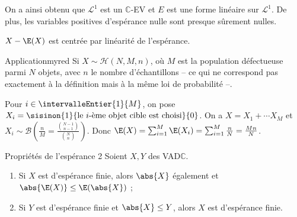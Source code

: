     On a ainsi obtenu que $\mathcal{L}^1$ est un $\mathbb{C}$-EV et $E$ est une forme linéaire sur $\mathcal{L}^1$. De plus, les variables positives d’espérance nulle sont presque sûrement nulles. 

    $X - \E(X)$ est centrée par linéarité de l’espérance.

    \begin{omed}{Application}{myred}
        Si $X \sim \mathcal{H}(N,M,n)$, où $M$ est la population défectueuse parmi $N$ objets, avec $n$ le nombre d’échantillons -- ce qui ne correspond pas exactement à la définition mais à la même loi de probabilité --. 

        Pour $i \in \intervalleEntier{1}{M}$, on pose $X_i = \sisinon{1}{\text{le } i\text{-ème objet cible est choisi}}{0}$. On a $X = X_1 + \cdots X_M$ et $X_i \sim \mathcal{B}(\frac{n}{M} = \frac{\binom{N-1}{n-1}}{\binom{N}{n}})$. Donc $\E(X) = \sum_{i = 1}^M \E(X_i) = \sum_{i = 1}^M \frac{n}{N} = \frac{Mn}{N}$. 
    \end{omed}

    \begin{theo}{Propriétés de l’espérance 2}{}
        Soient $X,Y$ des VAD$\mathbb{C}$. 
        \begin{enumerate}
            \item Si $X$ est d’espérance finie, alors $\abs{X}$ également et $\abs{\E(X)} \leq \E(\abs{X})$ ;
            \item Si $Y$ est d’espérance finie et $\abs{X} \leq Y$, alors $X$ est d’espérance finie.
        \end{enumerate}
    \end{theo}


